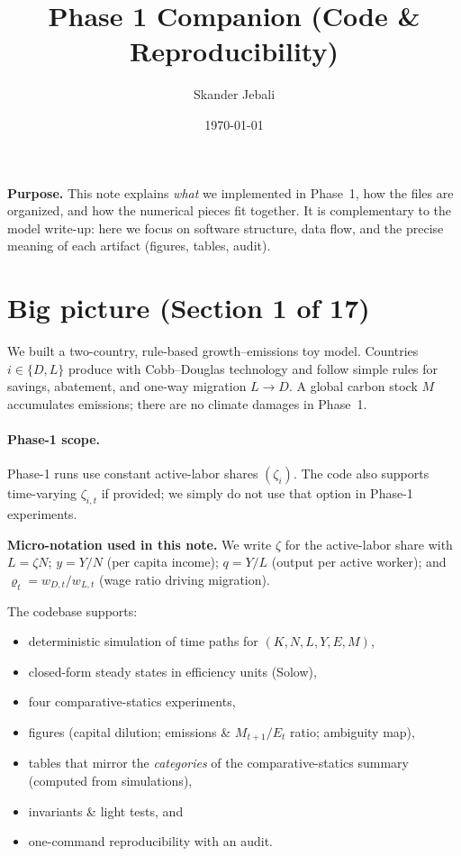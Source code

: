 \documentclass[12pt,a4paper]{article}
\title{\textbf{Phase 1 Companion (Code \& Reproducibility)}}
\author{Skander Jebali}
\date{\today}
\begin{document}
\maketitle


\begin{mdframed}[backgroundcolor=gray!10,linewidth=0.5pt]
\textbf{Purpose.} This note explains \emph{what} we implemented in Phase~1, how the files are organized, and how the numerical pieces fit together. It is complementary to the model write-up: here we focus on software structure, data flow, and the precise meaning of each artifact (figures, tables, audit).
\end{mdframed}


\section{Big picture (Section 1 of 17)}
We built a two-country, rule-based growth--emissions toy model. Countries \(i\in\{D,L\}\) produce with Cobb--Douglas technology and follow simple rules for savings, abatement, and one-way migration \(L\to D\). A global carbon stock \(M\) accumulates emissions; there are no climate damages in Phase~1.

\paragraph{Phase-1 scope.} Phase-1 runs use constant active-labor shares \((\zeta_i)\). The code also supports time-varying \(\zeta_{i,t}\) if provided; we simply do not use that option in Phase-1 experiments.\\

\begin{mdframed}[backgroundcolor=gray!08,linewidth=0.5pt]
\textbf{Micro-notation used in this note.}
We write $\zeta$ for the active-labor share with $L=\zeta N$; $y=Y/N$ (per capita income);
$q=Y/L$ (output per active worker); and $\varrho_t=w_{D,t}/w_{L,t}$ (wage ratio driving migration).
\end{mdframed}


\noindent The codebase supports:
\begin{itemize}[leftmargin=1.25em]
  \item deterministic simulation of time paths for \((K,N,L,Y,E,M)\),
  \item closed-form steady states in efficiency units (Solow),
  \item four comparative-statics experiments,
  \item figures (capital dilution; emissions \& \(M_{t+1}/E_t\) ratio; ambiguity map),
  \item tables that mirror the \emph{categories} of the comparative-statics summary (computed from simulations),
  \item invariants \& light tests, and
  \item one-command reproducibility with an audit.
\end{itemize}
\end{document}
